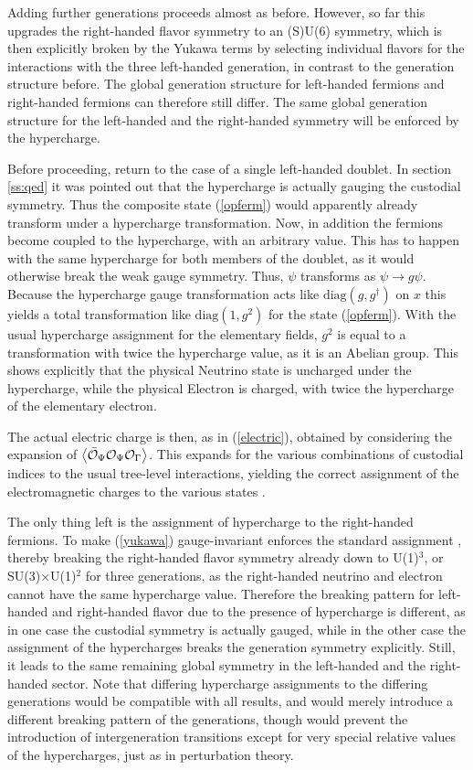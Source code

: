 \documentclass[final,12pt,3p,longtitle]{elsarticle}
\newcommand*{\pref}[1]{(\ref{#1})}
\newcommand*{\diag}{\mathrm{diag}}
\newcommand*{\1}{1\!\!\!\bot}
\newcommand*{\la}{\left\langle}
\newcommand*{\ra}{\right\rangle}
\newcommand*{\op}{{\cal O}}
\begin{document}
Adding further generations proceeds almost as before. However, so far this upgrades the right-handed flavor symmetry to an (S)U(6) symmetry, which is then explicitly broken by the Yukawa terms by selecting individual flavors for the interactions with the three left-handed generation, in contrast to the generation structure before. The global generation structure for left-handed fermions and right-handed fermions can therefore still differ. The same global generation structure for the left-handed and the right-handed symmetry will be enforced by the hypercharge.

Before proceeding, return to the case of a single left-handed doublet. In section \ref{ss:qed} it was pointed out that the hypercharge is actually gauging the custodial symmetry. Thus the composite state \pref{opferm} would apparently already transform under a hypercharge transformation. Now, in addition the fermions become coupled to the hypercharge, with an arbitrary value. This has to happen with the same hypercharge for both members of the doublet, as it would otherwise break the weak gauge symmetry. Thus, $\psi$ transforms as $\psi\to g\psi$. Because the hypercharge gauge transformation acts like $\diag(g,g^\dagger)$ on $x$ this yields a total transformation like $\diag(1,g^2)$ for the state \pref{opferm}. With the usual hypercharge assignment for the elementary fields, $g^2$ is equal to a transformation with twice the hypercharge value, as it is an Abelian group. This shows explicitly that the physical Neutrino state is uncharged under the hypercharge, while the physical Electron is charged, with twice the hypercharge of the elementary electron.

The actual electric charge is then, as in \pref{electric}, obtained by considering the expansion of $\la\bar{\op}_\Psi\op_\Psi\op_\Gamma\ra$. This expands for the various combinations of custodial indices to the usual tree-level interactions, yielding the correct assignment of the electromagnetic charges to the various states \cite{Bohm:2001yx}.

The only thing left is the assignment of hypercharge to the right-handed fermions. To make \pref{yukawa} gauge-invariant enforces the standard assignment \cite{Bohm:2001yx}, thereby breaking the right-handed flavor symmetry already down to U(1)$^3$, or SU(3)$\times$U(1)$^2$ for three generations, as the right-handed neutrino and electron cannot have the same hypercharge value. Therefore the breaking pattern for left-handed and right-handed flavor due to the presence of hypercharge is different, as in one case the custodial symmetry is actually gauged, while in the other case the assignment of the hypercharges breaks the generation symmetry explicitly. Still, it leads to the same remaining global symmetry in the left-handed and the right-handed sector. Note that differing hypercharge assignments to the differing generations would be compatible with all results, and would merely introduce a different breaking pattern of the generations, though would prevent the introduction of intergeneration transitions except for very special relative values of the hypercharges, just as in perturbation theory.
\end{document}
